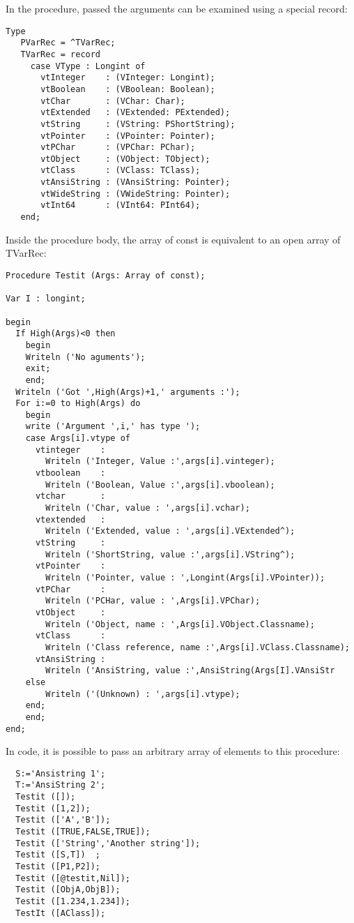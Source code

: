In the procedure, passed the arguments can be examined using a special
record:
\begin{verbatim}
Type
   PVarRec = ^TVarRec;
   TVarRec = record
     case VType : Longint of
       vtInteger    : (VInteger: Longint);
       vtBoolean    : (VBoolean: Boolean);
       vtChar       : (VChar: Char);
       vtExtended   : (VExtended: PExtended);
       vtString     : (VString: PShortString);
       vtPointer    : (VPointer: Pointer);
       vtPChar      : (VPChar: PChar);
       vtObject     : (VObject: TObject);
       vtClass      : (VClass: TClass);
       vtAnsiString : (VAnsiString: Pointer);
       vtWideString : (VWideString: Pointer);
       vtInt64      : (VInt64: PInt64);
   end;
\end{verbatim}
Inside the procedure body, the array of const is equivalent to
an open array of TVarRec:
\begin{verbatim}
Procedure Testit (Args: Array of const);

Var I : longint;

begin
  If High(Args)<0 then
    begin
    Writeln ('No aguments');
    exit;
    end;
  Writeln ('Got ',High(Args)+1,' arguments :');
  For i:=0 to High(Args) do
    begin
    write ('Argument ',i,' has type ');
    case Args[i].vtype of
      vtinteger    :
        Writeln ('Integer, Value :',args[i].vinteger);
      vtboolean    :
        Writeln ('Boolean, Value :',args[i].vboolean);
      vtchar       :
        Writeln ('Char, value : ',args[i].vchar);
      vtextended   :
        Writeln ('Extended, value : ',args[i].VExtended^);
      vtString     :
        Writeln ('ShortString, value :',args[i].VString^);
      vtPointer    :
        Writeln ('Pointer, value : ',Longint(Args[i].VPointer));
      vtPChar      :
        Writeln ('PCHar, value : ',Args[i].VPChar);
      vtObject     :
        Writeln ('Object, name : ',Args[i].VObject.Classname);
      vtClass      :
        Writeln ('Class reference, name :',Args[i].VClass.Classname);
      vtAnsiString :
        Writeln ('AnsiString, value :',AnsiString(Args[I].VAnsiStr
    else
        Writeln ('(Unknown) : ',args[i].vtype);
    end;
    end;
end;
\end{verbatim}
In code, it is possible to pass an arbitrary array of elements
to this procedure:
\begin{verbatim}
  S:='Ansistring 1';
  T:='AnsiString 2';
  Testit ([]);
  Testit ([1,2]);
  Testit (['A','B']);
  Testit ([TRUE,FALSE,TRUE]);
  Testit (['String','Another string']);
  Testit ([S,T])  ;
  Testit ([P1,P2]);
  Testit ([@testit,Nil]);
  Testit ([ObjA,ObjB]);
  Testit ([1.234,1.234]);
  TestIt ([AClass]);
\end{verbatim}

